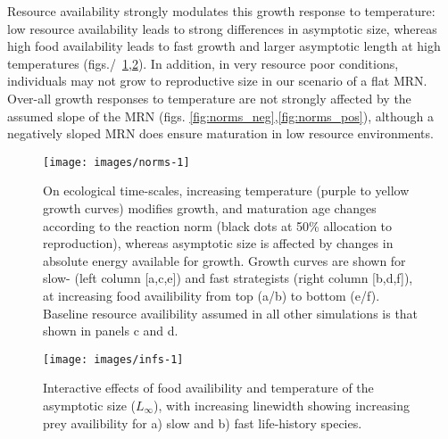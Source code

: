 \documentclass[11pt]{article}\usepackage[]{graphicx}\usepackage[]{color}
\makeatletter
\def\maxwidth{ %
  \ifdim\Gin@nat@width>\linewidth
    \linewidth
  \else
    \Gin@nat@width
  \fi
}
\makeatother
\begin{document}
Resource availability strongly modulates this growth response to temperature: low resource availability leads to strong differences in asymptotic size, whereas high food availability leads to fast growth and larger asymptotic length at high temperatures (figs./~\ref{fig:norms},\ref{fig:infs}). In addition, in very resource poor conditions, individuals may not grow to reproductive size in our scenario of a flat MRN. Over-all growth responses to temperature are not strongly affected by the assumed slope of the MRN (figs. \ref{fig:norms_neg},\ref{fig:norms_pos}), although a negatively sloped MRN does ensure maturation in low resource environments.




\begin{figure}

{\centering \texttt{[image: images/norms-1]} 

}

\caption[On ecological time-scales, increasing temperature (purple to yellow growth curves) modifies growth, and maturation age changes according to the reaction norm (black dots at 50\% allocation to reproduction), whereas asymptotic size is affected by changes in absolute energy available for growth]{On ecological time-scales, increasing temperature (purple to yellow growth curves) modifies growth, and maturation age changes according to the reaction norm (black dots at 50\% allocation to reproduction), whereas asymptotic size is affected by changes in absolute energy available for growth. Growth curves are shown for slow- (left column [a,c,e]) and fast strategists (right column [b,d,f]), at increasing food availibility from top (a/b) to bottom (e/f). Baseline resource availibility assumed in all other simulations is that shown in panels c and d.}\label{fig:norms}
\end{figure}



\begin{figure}

{\centering \texttt{[image: images/infs-1]} 

}

\caption[Interactive effects of food availibility and temperature of the asymptotic size ($L_{\infty}$), with increasing linewidth showing increasing prey availibility for a) slow and b) fast life-history species]{Interactive effects of food availibility and temperature of the asymptotic size ($L_{\infty}$), with increasing linewidth showing increasing prey availibility for a) slow and b) fast life-history species.}\label{fig:infs}
\end{figure}
\end{document}
